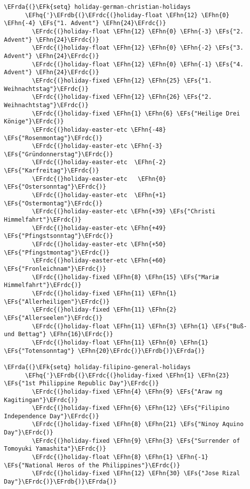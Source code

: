 \documentclass[a4wide,10pt]{article}
\newcommand{\EFs}[1]{\textcolor{EFs}{#1}} %
\newcommand{\EFk}[1]{\textcolor{EFk}{#1}} %
\newcommand{\EFhn}[1]{\textcolor{EFhn}{\textbf{#1}}} %
\newcommand{\EFhq}[1]{\textcolor{EFhq}{#1}} %
\newcommand{\EFrda}[1]{\textcolor{EFrda}{#1}} %
\newcommand{\EFrdb}[1]{\textcolor{EFrdb}{#1}} %
\newcommand{\EFrdc}[1]{\textcolor{EFrdc}{#1}} %
\begin{document}
\begin{Code}
\begin{Verbatim}
\EFrda{(}\EFk{setq} holiday-german-christian-holidays
      \EFhq{'}\EFrdb{(}\EFrdc{(}holiday-float \EFhn{12} \EFhn{0} \EFhn{-4} \EFs{"1. Advent"} \EFhn{24}\EFrdc{)}
        \EFrdc{(}holiday-float \EFhn{12} \EFhn{0} \EFhn{-3} \EFs{"2. Advent"} \EFhn{24}\EFrdc{)}
        \EFrdc{(}holiday-float \EFhn{12} \EFhn{0} \EFhn{-2} \EFs{"3. Advent"} \EFhn{24}\EFrdc{)}
        \EFrdc{(}holiday-float \EFhn{12} \EFhn{0} \EFhn{-1} \EFs{"4. Advent"} \EFhn{24}\EFrdc{)}
        \EFrdc{(}holiday-fixed \EFhn{12} \EFhn{25} \EFs{"1. Weihnachtstag"}\EFrdc{)}
        \EFrdc{(}holiday-fixed \EFhn{12} \EFhn{26} \EFs{"2. Weihnachtstag"}\EFrdc{)}
        \EFrdc{(}holiday-fixed \EFhn{1} \EFhn{6} \EFs{"Heilige Drei Könige"}\EFrdc{)}
        \EFrdc{(}holiday-easter-etc \EFhn{-48} \EFs{"Rosenmontag"}\EFrdc{)}
        \EFrdc{(}holiday-easter-etc \EFhn{-3} \EFs{"Gründonnerstag"}\EFrdc{)}
        \EFrdc{(}holiday-easter-etc  \EFhn{-2} \EFs{"Karfreitag"}\EFrdc{)}
        \EFrdc{(}holiday-easter-etc   \EFhn{0} \EFs{"Ostersonntag"}\EFrdc{)}
        \EFrdc{(}holiday-easter-etc  \EFhn{+1} \EFs{"Ostermontag"}\EFrdc{)}
        \EFrdc{(}holiday-easter-etc \EFhn{+39} \EFs{"Christi Himmelfahrt"}\EFrdc{)}
        \EFrdc{(}holiday-easter-etc \EFhn{+49} \EFs{"Pfingstsonntag"}\EFrdc{)}
        \EFrdc{(}holiday-easter-etc \EFhn{+50} \EFs{"Pfingstmontag"}\EFrdc{)}
        \EFrdc{(}holiday-easter-etc \EFhn{+60} \EFs{"Fronleichnam"}\EFrdc{)}
        \EFrdc{(}holiday-fixed \EFhn{8} \EFhn{15} \EFs{"Mariæ Himmelfahrt"}\EFrdc{)}
        \EFrdc{(}holiday-fixed \EFhn{11} \EFhn{1} \EFs{"Allerheiligen"}\EFrdc{)}
        \EFrdc{(}holiday-fixed \EFhn{11} \EFhn{2} \EFs{"Allerseelen"}\EFrdc{)}
        \EFrdc{(}holiday-float \EFhn{11} \EFhn{3} \EFhn{1} \EFs{"Buß- und Bettag"} \EFhn{16}\EFrdc{)}
        \EFrdc{(}holiday-float \EFhn{11} \EFhn{0} \EFhn{1} \EFs{"Totensonntag"} \EFhn{20}\EFrdc{)}\EFrdb{)}\EFrda{)}

\EFrda{(}\EFk{setq} holiday-filipino-general-holidays
      \EFhq{'}\EFrdb{(}\EFrdc{(}holiday-fixed \EFhn{1} \EFhn{23} \EFs{"1st Philippine Republic Day"}\EFrdc{)}
        \EFrdc{(}holiday-fixed \EFhn{4} \EFhn{9} \EFs{"Araw ng Kagitingan"}\EFrdc{)}
        \EFrdc{(}holiday-fixed \EFhn{6} \EFhn{12} \EFs{"Filipino Independence Day"}\EFrdc{)}
        \EFrdc{(}holiday-fixed \EFhn{8} \EFhn{21} \EFs{"Ninoy Aquino Day"}\EFrdc{)}
        \EFrdc{(}holiday-fixed \EFhn{9} \EFhn{3} \EFs{"Surrender of Tomoyuki Yamashita"}\EFrdc{)}
        \EFrdc{(}holiday-float \EFhn{8} \EFhn{1} \EFhn{-1} \EFs{"National Heros of the Philippines"}\EFrdc{)}
        \EFrdc{(}holiday-fixed \EFhn{12} \EFhn{30} \EFs{"Jose Rizal Day"}\EFrdc{)}\EFrdb{)}\EFrda{)}


\end{Verbatim}
\end{Code}
\end{document}
